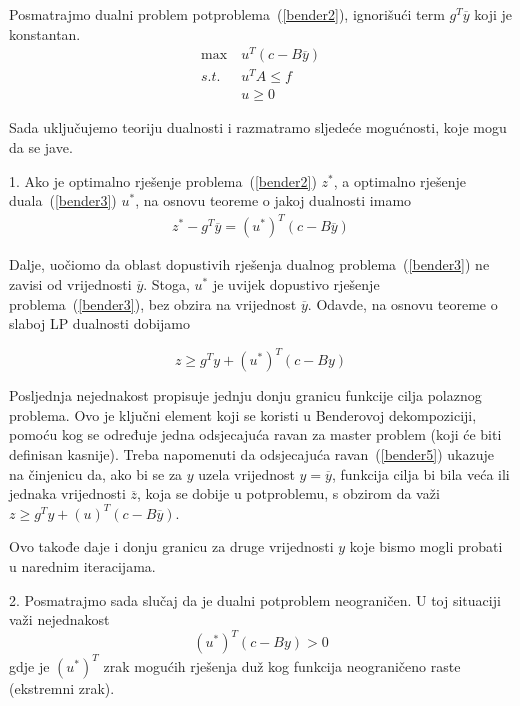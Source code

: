 \documentclass[a4paper, utf8, 11pt, colorlinks]{book}
\begin{document}
Posmatrajmo dualni problem potproblema~(\ref{bender2}), ignorišući term $g^T\overline{y}$ koji je konstantan.
  \begin{equation}
	\begin{aligned}\label{bender3}
	\max\ &u^T (c-B\overline{y})\\
	s.t.\ &u^TA\leqslant f\\
	&u\geqslant 0
  \end{aligned}
\end{equation}

Sada uključujemo teoriju dualnosti i razmatramo sljedeće mogućnosti, koje mogu da se jave.
 
1. Ako je optimalno rješenje problema~(\ref{bender2}) $z^*$, a optimalno rješenje duala~(\ref{bender3}) $u^*$, na osnovu teoreme o jakoj  dualnosti imamo
  \begin{equation}
	\begin{aligned}\label{bender4}
z^*-g^T\overline{y}=(u^*)^T(c-B\overline{y})
	\end{aligned}
\end{equation}


Dalje, uočiomo da oblast dopustivih rješenja dualnog problema~(\ref{bender3}) ne zavisi od vrijednosti $\overline{y}$. Stoga, $u^*$ je uvijek dopustivo rješenje problema~(\ref{bender3}), bez obzira na vrijednost $\overline{y}$. Odavde, na osnovu teoreme o slaboj LP dualnosti dobijamo

  \begin{equation}
\label{bender5}
		z\geqslant g^Ty+(u^*)^T(c-By)
\end{equation}


Posljednja nejednakost propisuje jednju donju granicu funkcije cilja polaznog problema. Ovo je ključni element koji se koristi u Benderovoj dekompoziciji, pomoću kog se određuje jedna odsjecajuća ravan za master problem (koji će biti definisan kasnije). Treba napomenuti da odsjecajuća ravan~(\ref{bender5}) ukazuje na činjenicu da, ako bi se za $y$ uzela vrijednost $y=\overline{y}$, funkcija cilja bi bila veća ili jednaka vrijednosti $\overline{z}$, koja se dobije u potproblemu, s obzirom da važi $	z\geqslant g^Ty+(u)^T(c-B\overline{y})$.

Ovo takođe daje i donju granicu za druge vrijednosti $y$ koje bismo mogli probati u narednim iteracijama.

2. Posmatrajmo sada slučaj da je dualni potproblem neograničen. U toj situaciji važi nejednakost
\begin{equation}
	\label{bender6}
	(u^*)^T(c-By)>0
\end{equation}
gdje je ${(u^*)}^T$ zrak mogućih rješenja duž kog funkcija neograničeno raste (ekstremni zrak).
\end{document}
